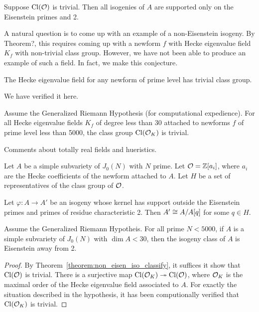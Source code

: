\documentclass{article}
\begin{document}
\begin{corollary}
    Suppose $\operatorname{Cl}(\mathcal{O})$ is trivial. Then all isogenies of $A$ are supported only
    on the Eisenstein primes and 2.
\end{corollary}

A natural question is to come up with an example of a non-Eisenstein isogeny.
By Theorem?, this requires coming up with a newform $f$ with Hecke eigenvalue
field $K_f$ with non-trivial class group. However, we have not been able to
produce an example of such a field. In fact, we make this conjecture.

\begin{conjecture}
    The Hecke eigenvalue field for any newform of prime level has trivial class
    group.
\end{conjecture}

We have verified it here.

\begin{proposition}
    Assume the Generalized Riemann Hypothesis (for computational expedience).
    For all Hecke eigenvalue fields $K_f$ of degree less than 30 attached to
    newforms $f$ of prime level less than 5000, the class group $\operatorname{Cl}(\mathcal{O}_K)$ is
    trivial.
\end{proposition}

Comments about totally real fields and hueristics.


\begin{theorem}\label{theorem:non_eisen_iso_classify}
    Let $A$ be a simple subvariety of $J_0(N)$ with $N$ prime. Let
    $\mathcal{O}=\mathbb{Z}[a_i]$, where $a_i$ are the Hecke coefficients of the newform
    attached to $A$. Let $H$ be a set of representatives of the class group of
    $\mathcal{O}$.

    Let $\varphi:A\to A'$ be an isogeny whose kernel has support outside the
    Eisenstein primes and primes of residue characteristic 2. Then $A'\cong
    A/A[q]$ for some $q\in H$.
\end{theorem}

\begin{corollary}\label{corollary:compute_class_group_trivial}
    Assume the Generalized Riemann Hypotheis. For all prime $N<5000$, if $A$ is
    a simple subvariety of $J_0(N)$ with $\dim A< 30$, then the isogeny class
    of $A$ is Eisenstein away from 2.
\end{corollary}
\begin{proof}
    By Theorem~\ref{theorem:non_eisen_iso_classify}, it suffices it show that
    $\operatorname{Cl}(\mathcal{O})$ is trivial. There is a surjective map $\operatorname{Cl}(\mathcal{O}_K)\twoheadrightarrow \operatorname{Cl}(\mathcal{O})$,
    where $\mathcal{O}_K$ is the maximal order of the Hecke eigenvalue field associated
    to $A$. For exactly the situation described in the hypothesis, it has been
    computionally verified that $\operatorname{Cl}(\mathcal{O}_K)$ is trivial.
\end{proof}
\end{document}
